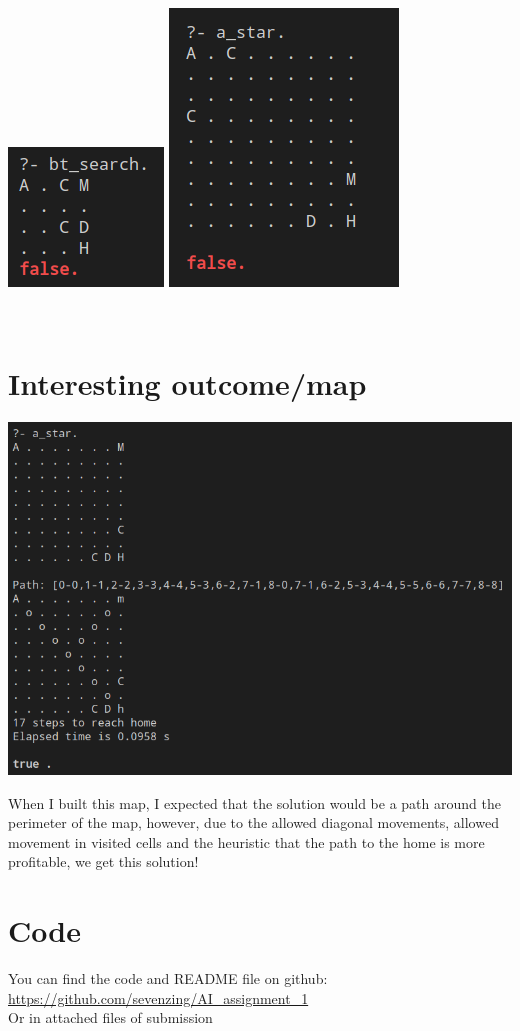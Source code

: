 \documentclass{article}
\begin{document}
\includegraphics[scale=1.7]{impossible_map_1.png}
\includegraphics[scale=0.9]{impossible_map_2.png}

\\

\section{Interesting outcome/map}

\includegraphics[scale=0.85]{interesting_map.png}

When I built this map, I expected that the solution would be a path around the perimeter of the map, however, due to the allowed diagonal movements, allowed movement in visited cells and the heuristic that the path to the home is more profitable, we get this solution!

\section{Code}

You can find the code and README file on github: \url{https://github.com/sevenzing/AI_assignment_1}
\\
Or in attached files of submission 
\end{document}
